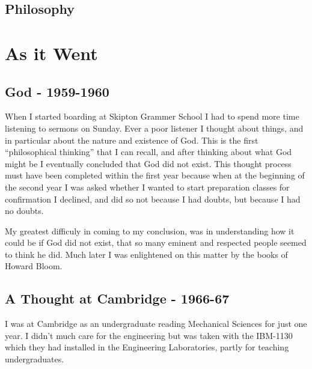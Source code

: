 \documentclass{rbjk}
\begin{document}
\begin{article}
\subsection{Philosophy}

\section{As it Went}

\subsection{God - 1959-1960}

When I started boarding at Skipton Grammer School I had to spend more time listening to sermons on Sunday.
Ever a poor listener I thought about things, and in particular about the nature and existence of God.
This is the first ``philosophical thinking'' that I can recall, and after thinking about what God might be I eventually concluded that God did not exist.
This thought process must have been completed within the first year because when at the beginning of the second year I was asked whether I wanted to start preparation classes for confirmation I declined, and did so not because I had doubts, but because I had no doubts.

My greatest difficuly in coming to my conclusion, was in understanding how it could be if God did not exist, that so many eminent and respected people seemed to think he did.
Much later I was enlightened on this matter by the books of Howard Bloom.

\subsection{A Thought at Cambridge - 1966-67}

I was at Cambridge as an undergraduate reading Mechanical Sciences for just one year.
I didn't much care for the engineering but was taken with the IBM-1130 which they had installed in the Engineering Laboratories, partly for teaching undergraduates.


\end{article}
\end{document}
